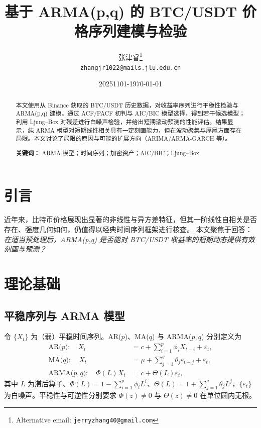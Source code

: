\documentclass[12pt]{article}
\title{基于 ARMA(p,q) 的 BTC/USDT 价格序列建模与检验}
\author{张津睿\thanks{Alternative email: \texttt{jerryzhang40@gmail.com}}\\
\texttt{zhangjr1022@mails.jlu.edu.cn}}
\date{20251101-\today}
\theoremstyle{definition}
\begin{document}
\maketitle

\begin{abstract}
    本文使用从 Binance 获取的 BTC/USDT 历史数据，对收益率序列进行平稳性检验与 ARMA(p,q) 建模。通过 ACF/PACF 初判与 AIC/BIC 模型选择，得到若干候选模型；利用 Ljung--Box 对残差进行白噪声检验，并给出短期滚动预测的性能评估。结果显示，纯 ARMA 模型对短期线性相关具有一定刻画能力，但在波动聚集与厚尾方面存在局限。本文讨论了局限的原因与可能的扩展方向（ARIMA/ARMA-GARCH 等）。\par
    \textbf{关键词：} ARMA 模型；时间序列；加密资产；AIC/BIC；Ljung--Box
\end{abstract}

\tableofcontents
\newpage

\section{引言}
\label{sec:intro}
近年来，比特币价格展现出显著的非线性与异方差特征，但其一阶线性自相关是否存在、强度几何如何，仍值得以经典时间序列框架进行核查。\cite{boxjenkins,bnd} 本文聚焦于回答：\emph{在适当预处理后，ARMA(p,q) 是否能对 BTC/USDT 收益率的短期动态提供有效刻画与预测？}

\section{理论基础}
\label{sec:theory}
\subsection{平稳序列与 ARMA 模型}
令 $\{X_t\}$ 为（弱）平稳时间序列。AR($p$)、MA($q$) 与 ARMA($p,q$) 分别定义为
\begin{align}
    \text{AR($p$)}:\quad
    X_t        & = c + \sum_{i=1}^p \phi_i X_{t-i} + \varepsilon_t,               \\
    \text{MA($q$)}:\quad
    X_t        & = \mu + \sum_{j=1}^q \theta_j \varepsilon_{t-j} + \varepsilon_t, \\
    \text{ARMA($p,q$)}:\quad
    \Phi(L)X_t & = c + \Theta(L)\varepsilon_t,
\end{align}
其中 $L$ 为滞后算子、$\Phi(L)=1-\sum_{i=1}^p \phi_i L^i$、$\Theta(L)=1+\sum_{j=1}^q \theta_j L^j$，$\{\varepsilon_t\}$ 为白噪声。平稳性与可逆性分别要求 $\Phi(z)\neq 0$ 与 $\Theta(z)\neq 0$ 在单位圆内无根。
\end{document}
